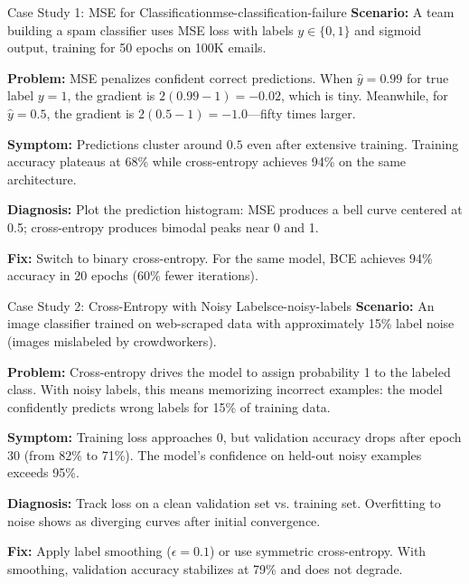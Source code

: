 \documentclass[../../main.tex]{subfiles}
\begin{document}
\begin{example}{Case Study 1: MSE for Classification}{mse-classification-failure}
\textbf{Scenario:} A team building a spam classifier uses MSE loss with labels $y \in \{0, 1\}$ and sigmoid output, training for 50 epochs on 100K emails.

\textbf{Problem:} MSE penalizes confident correct predictions. When $\hat{y} = 0.99$ for true label $y = 1$, the gradient is $2(0.99 - 1) = -0.02$, which is tiny. Meanwhile, for $\hat{y} = 0.5$, the gradient is $2(0.5 - 1) = -1.0$---fifty times larger.

\textbf{Symptom:} Predictions cluster around $0.5$ even after extensive training. Training accuracy plateaus at 68\% while cross-entropy achieves 94\% on the same architecture.

\textbf{Diagnosis:} Plot the prediction histogram: MSE produces a bell curve centered at 0.5; cross-entropy produces bimodal peaks near 0 and 1.

\textbf{Fix:} Switch to binary cross-entropy. For the same model, BCE achieves 94\% accuracy in 20 epochs (60\% fewer iterations).
\end{example}

\begin{example}{Case Study 2: Cross-Entropy with Noisy Labels}{ce-noisy-labels}
\textbf{Scenario:} An image classifier trained on web-scraped data with approximately 15\% label noise (images mislabeled by crowdworkers).

\textbf{Problem:} Cross-entropy drives the model to assign probability 1 to the labeled class. With noisy labels, this means memorizing incorrect examples: the model confidently predicts wrong labels for 15\% of training data.

\textbf{Symptom:} Training loss approaches 0, but validation accuracy drops after epoch 30 (from 82\% to 71\%). The model's confidence on held-out noisy examples exceeds 95\%.

\textbf{Diagnosis:} Track loss on a clean validation set vs. training set. Overfitting to noise shows as diverging curves after initial convergence.

\textbf{Fix:} Apply label smoothing ($\epsilon = 0.1$) or use symmetric cross-entropy. With smoothing, validation accuracy stabilizes at 79\% and does not degrade.
\end{example}
\end{document}

